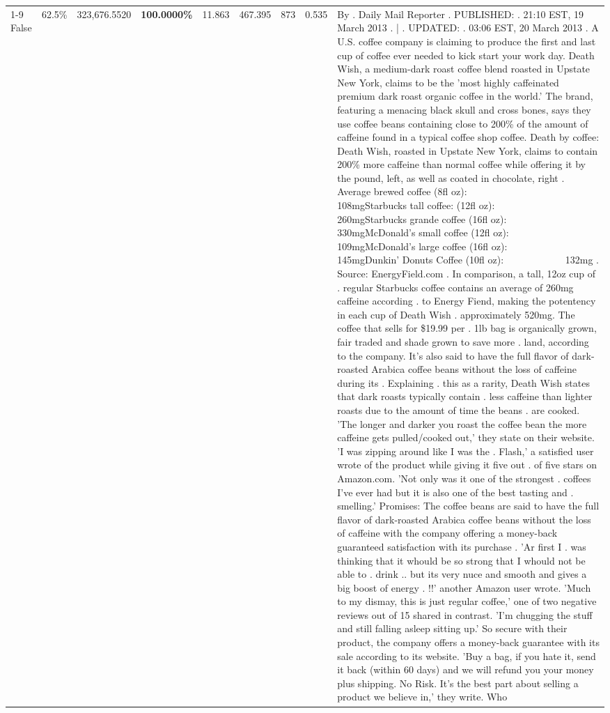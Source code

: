 \begin{table}[H]
{\begin{tabular}{lllrlllll}
\cline{1-9}
False & 62.5\% & 323,676.5520 & \bfseries \color{red} 100.0000\% & 11.863 & 467.395 & 873 & 0.535 & By . Daily Mail Reporter . PUBLISHED: . 21:10 EST, 19 March 2013 . | . UPDATED: . 03:06 EST, 20 March 2013 . A U.S. coffee company is claiming to produce the first and last cup of coffee ever needed to kick start your work day. Death Wish, a medium-dark roast coffee blend roasted in Upstate New York, claims to be the 'most highly caffeinated premium dark roast organic coffee in the world.' The brand, featuring a menacing black skull and cross bones, says they use coffee beans containing close to 200\% of the amount of caffeine found in a typical coffee shop coffee. Death by coffee: Death Wish, roasted in Upstate New York, claims to contain 200\% more caffeine than normal coffee while offering it by the pound, left, as well as coated in chocolate, right . Average brewed coffee (8fl oz):              108mgStarbucks tall coffee: (12fl oz):                260mgStarbucks grande coffee (16fl oz):         330mgMcDonald's small coffee (12fl oz):           109mgMcDonald's large coffee (16fl oz):           145mgDunkin' Donuts Coffee (10fl oz):             132mg . Source: EnergyField.com . In comparison, a tall, 12oz cup of . regular Starbucks coffee contains an average of 260mg caffeine according . to Energy Fiend, making the potentency in each cup of Death Wish . approximately 520mg. The coffee that sells for \$19.99 per . 1lb bag is organically grown, fair traded and shade grown to save more . land, according to the company. It's also said to have the full flavor of dark-roasted Arabica coffee beans without the loss of caffeine during its . Explaining . this as a rarity, Death Wish states that dark roasts typically contain . less caffeine than lighter roasts due to the amount of time the beans . are cooked. 'The longer and darker you roast the coffee bean the more caffeine gets pulled/cooked out,' they state on their website. 'I was zipping around like I was the . Flash,' a satisfied user wrote of the product while giving it five out . of five stars on Amazon.com. 'Not only was it one of the strongest . coffees I've ever had but it is also one of the best tasting and . smelling.’ Promises: The coffee beans are said to have the full flavor of dark-roasted Arabica coffee beans without the loss of caffeine with the company offering a money-back guaranteed satisfaction with its purchase . 'Ar first I . was thinking that it whould be so strong that I whould not be able to . drink .. but its very nuce and smooth and gives a big boost of energy . !!' another Amazon user wrote. 'Much to my dismay, this is just regular coffee,' one of two negative reviews out of 15 shared in contrast. 'I'm chugging the stuff and still falling asleep sitting up.' So secure with their product, the company offers a money-back guarantee with its sale according to its website. 'Buy a bag, if you hate it, send it back (within 60 days) and we will refund you your money plus shipping. No Risk. It’s the best part about selling a product we believe in,' they write. Who \\

\end{tabular}}
\end{table}
